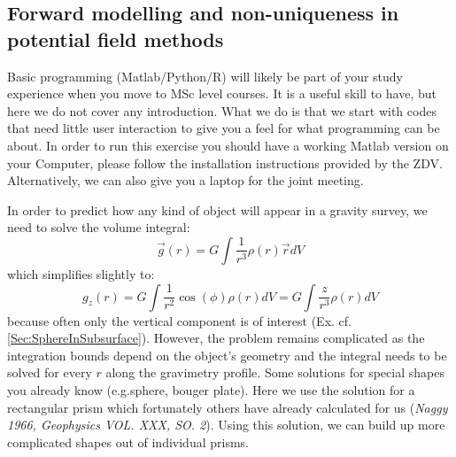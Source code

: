 \subsection{Forward modelling and non-uniqueness in potential field methods}
\begin{tcolorbox}[enhanced jigsaw,breakable,pad at break*=1mm,
  colback=blue!5!white,colframe=burgundy,title=Matlab (or Python),
  watermark color=white]
  Basic programming (Matlab/Python/R) will  likely be part of your study experience when you move to MSc level courses. It is a useful skill to have, but here we do not cover any introduction. What we do is that we start with codes that need  little user interaction to give you a feel for what programming can be about. In order to run this exercise you should have a working Matlab version on your Computer, please follow the installation instructions provided by the ZDV. Alternatively, we can also give you a laptop for the joint meeting.
\end{tcolorbox}
\label{Sec:GravityForwardModelling}
In order to predict how any kind of object will appear in a gravity survey, we need to solve the volume integral:
$$
 \vec{g}(r) = G\int \frac{1}{r^3} \rho(r) \vec{r} dV 
$$
which simplifies slightly to:
$$
 g_z(r) = G\int \frac{1}{r^2} \cos(\phi)\rho(r) dV = G\int \frac{z}{r^3} \rho(r) dV
$$
because often only the vertical component is of interest (Ex. cf. \ref{Sec:SphereInSubsurface}).
However, the problem remains complicated as the integration bounds depend on the object's geometry and the integral needs to be solved for every $r$ along the gravimetry profile. Some solutions for special shapes you already know (e.g.sphere, bouger plate). Here we use the solution for a rectangular prism which fortunately others have already calculated for us (\textit{Naggy 1966, Geophysics VOL. XXX, SO. 2}). Using this solution, we can build up more complicated shapes out of individual prisms.


